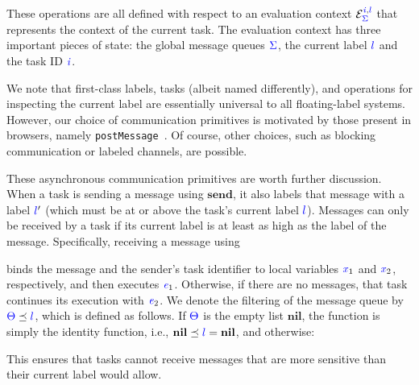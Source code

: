 \documentclass{llncs}
\newcommand{\Varid}[1]{\mathit{#1}}
\begin{document}
These operations are all defined with respect to an evaluation context
\ensuremath{\mathcal{E}_{\ifc{\Sigma}}^{\ifc{\Varid{i}},\ifc{l}}} that represents the context of the current task.
The evaluation context has three important pieces of
state: the global message queues \ensuremath{\ifc{\Sigma}}, the current label \ensuremath{\ifc{l}} and the task ID \ensuremath{\ifc{\Varid{i}}}.

We note that first-class labels, tasks (albeit named differently), and
operations for inspecting the current label are essentially universal to
all floating-label systems.
However, our choice of communication primitives is motivated by
those present in browsers, namely \texttt{postMessage}~\cite{webmessaging}.
Of course, other choices, such as blocking communication or labeled channels,
are possible. 

These asynchronous communication primitives are worth further
discussion.  When a task is sending a message using \ensuremath{\mathbf{send}}, it also labels that
message with a label \ensuremath{\ifc{l}'} (which must be at or above the task's current label \ensuremath{\ifc{l}}).
Messages can only be received by a task if its current label is
at least as high as the label of the message.
Specifically, receiving a message using

binds the message and the sender's task identifier
to local variables \ensuremath{\ifc{\Varid{x}}_{1}} and \ensuremath{\ifc{\Varid{x}}_{2}}, respectively, and then executes \ensuremath{\ifc{\Varid{e}}_{1}}.
Otherwise, if there are no messages, that task continues its execution with \ensuremath{\ifc{\Varid{e}}_{2}}.
We denote the filtering of the message queue by \ensuremath{\ifc{\Theta}\preceq\ifc{l}},
which is defined as follows.
If \ensuremath{\ifc{\Theta}} is the empty list \ensuremath{\mathbf{nil}}, the
function is simply the identity function, i.e.,
\ensuremath{\mathbf{nil}\preceq\ifc{l}\mathrel{=}\mathbf{nil}}, and otherwise:

This ensures that tasks cannot receive messages that are more sensitive
than their current label would allow.
\end{document}
